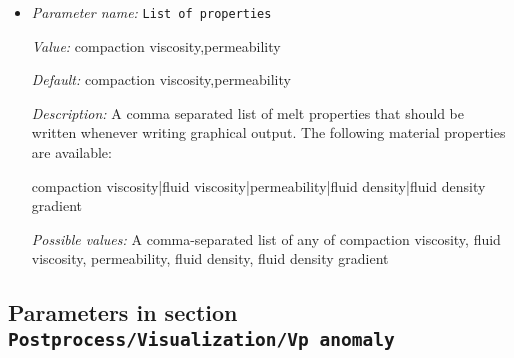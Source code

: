 \begin{itemize}
\item {\it Parameter name:} {\tt List of properties}
\label{parameters:Postprocess/Visualization/Melt material properties/List of properties}


{\it Value:} compaction viscosity,permeability


{\it Default:} compaction viscosity,permeability


{\it Description:} A comma separated list of melt properties that should be written whenever writing graphical output. The following material properties are available:

compaction viscosity|fluid viscosity|permeability|fluid density|fluid density gradient


{\it Possible values:} A comma-separated list of any of compaction viscosity, fluid viscosity, permeability, fluid density, fluid density gradient
\end{itemize}

\subsection{Parameters in section \tt Postprocess/Visualization/Vp anomaly}
\label{parameters:Postprocess/Visualization/Vp_20anomaly}

